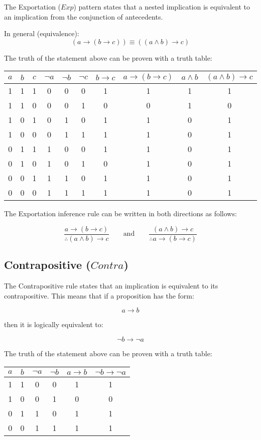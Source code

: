 \documentclass[12pt,a4paper,openany]{article}
\begin{document}
The Exportation (\(Exp\)) pattern states that a nested implication is equivalent to an implication from the conjunction of antecedents.

In general (equivalence):
\[(a \to (b \to c)) \equiv ((a \land b) \to c)\]

The truth of the statement above can be proven with a truth table:

\begin{center}
\begin{tabular}{|c|c|c|c|c|c|c|c|c|c|}
\hline
\(a\) & \(b\) & \(c\) & \(\neg a\) & \(\neg b\) & \(\neg c\) & \(b \to c\) & \(a \to (b \to c)\) & \(a \land b\) & \((a \land b) \to c\) \\
\hline
1 & 1 & 1 & 0 & 0 & 0 & 1 & 1 & 1 & 1 \\
1 & 1 & 0 & 0 & 0 & 1 & 0 & 0 & 1 & 0 \\
1 & 0 & 1 & 0 & 1 & 0 & 1 & 1 & 0 & 1 \\
1 & 0 & 0 & 0 & 1 & 1 & 1 & 1 & 0 & 1 \\
0 & 1 & 1 & 1 & 0 & 0 & 1 & 1 & 0 & 1 \\
0 & 1 & 0 & 1 & 0 & 1 & 0 & 1 & 0 & 1 \\
0 & 0 & 1 & 1 & 1 & 0 & 1 & 1 & 0 & 1 \\
0 & 0 & 0 & 1 & 1 & 1 & 1 & 1 & 0 & 1 \\
\hline
\end{tabular}
\end{center}

The Exportation inference rule can be written in both directions as follows:

\[
\frac{a \to (b \to c)}{\therefore (a \land b) \to c}
\qquad \text{and} \qquad
\frac{(a \land b) \to c}{\therefore a \to (b \to c)}
\]

\subsection{Contrapositive (\(Contra\))}\label{contrapositive-contra}

The Contrapositive rule states that an implication is equivalent to its contrapositive. This means that if a proposition has the form:

\[a \to b\]

then it is logically equivalent to:

\[\lnot b \to \lnot a\]

The truth of the statement above can be proven with a truth table:

\begin{center}
\begin{tabular}{|c|c|c|c|c|c|}
\hline
\(a\) & \(b\) & \(\lnot a\) & \(\lnot b\) & \(a \to b\) & \(\lnot b \to \lnot a\) \\
\hline
1 & 1 & 0 & 0 & 1 & 1 \\
1 & 0 & 0 & 1 & 0 & 0 \\
0 & 1 & 1 & 0 & 1 & 1 \\
0 & 0 & 1 & 1 & 1 & 1 \\
\hline
\end{tabular}
\end{center}
\end{document}
